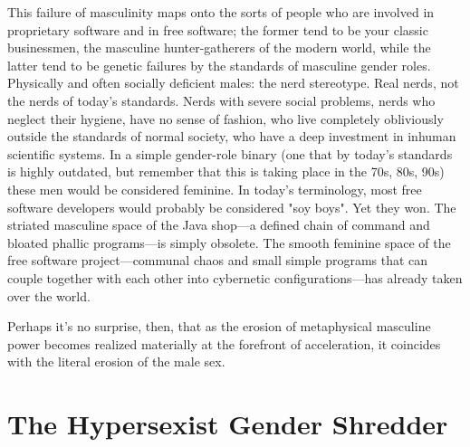 \documentclass[10pt, statementpaper, twoside, openright]{memoir}
\begin{document}
This failure of masculinity maps onto the sorts of people who are involved in proprietary software and in free software; the former tend to be your classic businessmen, the masculine hunter-gatherers of the modern world, while the latter tend to be genetic failures by the standards of masculine gender roles. Physically and often socially deficient males: the nerd stereotype. Real nerds, not the nerds of today's standards. Nerds with severe social problems, nerds who neglect their hygiene, have no sense of fashion, who live completely obliviously outside the standards of normal society, who have a deep investment in inhuman scientific systems. In a simple gender-role binary (one that by today's standards is highly outdated, but remember that this is taking place in the 70s, 80s, 90s) these men would be considered feminine. In today's terminology, most free software developers would probably be considered "soy boys". Yet they won. The striated masculine space of the Java shop---a defined chain of command and bloated phallic programs---is simply obsolete. The smooth feminine space of the free software project---communal chaos and small simple programs that can couple together with each other into cybernetic configurations---has already taken over the world.

Perhaps it's no surprise, then, that as the erosion of metaphysical masculine power becomes realized materially at the forefront of acceleration, it coincides with the literal erosion of the male sex.

\chapter{The Hypersexist Gender Shredder}
\end{document}
